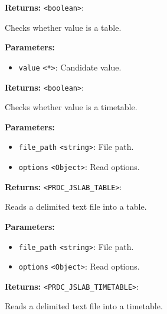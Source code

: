 \documentclass[12pt,a4paper]{article}
\begin{document}
\noindent \textbf{Returns:} \texttt{<boolean>}:

\noindent Checks whether value is a table.

\vspace{5mm}
\noindent {}


\noindent \textbf{Parameters:}
\begin{itemize}
  \item \texttt{value} \texttt{<*>}: Candidate value.
\end{itemize}

\noindent \textbf{Returns:} \texttt{<boolean>}:

\noindent Checks whether value is a timetable.

\vspace{5mm}
\noindent {}


\noindent \textbf{Parameters:}
\begin{itemize}
  \item \texttt{file\_path} \texttt{<string>}: File path.
  \item \texttt{options} \texttt{<Object>}: Read options.
\end{itemize}

\noindent \textbf{Returns:} \texttt{<PRDC\_JSLAB\_TABLE>}:

\noindent Reads a delimited text file into a table.

\vspace{5mm}
\noindent {}


\noindent \textbf{Parameters:}
\begin{itemize}
  \item \texttt{file\_path} \texttt{<string>}: File path.
  \item \texttt{options} \texttt{<Object>}: Read options.
\end{itemize}

\noindent \textbf{Returns:} \texttt{<PRDC\_JSLAB\_TIMETABLE>}:

\noindent Reads a delimited text file into a timetable.
\end{document}
